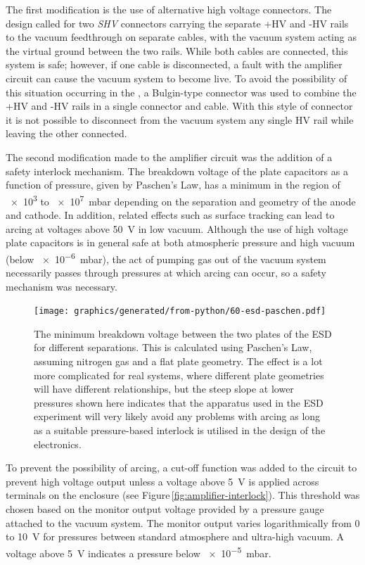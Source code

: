 The first modification is the use of alternative high voltage connectors. The \AEIPROTOTYPE{} design called for two \emph{SHV} connectors carrying the separate +\gls{HV} and -\gls{HV} rails to the vacuum feedthrough on separate cables, with the vacuum system acting as the virtual ground between the two rails. While both cables are connected, this system is safe; however, if one cable is disconnected, a fault with the amplifier circuit can cause the vacuum system to become live. To avoid the possibility of this situation occurring in the \SSM{}, a Bulgin-type connector was used to combine the +\gls{HV} and -\gls{HV} rails in a single connector and cable. With this style of connector it is not possible to disconnect from the vacuum system any single \gls{HV} rail while leaving the other connected.

The second modification made to the amplifier circuit was the addition of a safety interlock mechanism. The breakdown voltage of the plate capacitors as a function of pressure, given by Paschen's Law, has a minimum in the region of \SI{e3}{} to \SI{e7}{\milli\bar} depending on the separation and geometry of the anode and cathode. In addition, related effects such as surface tracking can lead to arcing at voltages above \SI{50}{\volt} in low vacuum. Although the use of high voltage plate capacitors is in general safe at both atmospheric pressure and high vacuum (below \SI{e-6}{\milli\bar}), the act of pumping gas out of the vacuum system necessarily passes through pressures at which arcing can occur, so a safety mechanism was necessary.

\begin{figure}
  \centering
  \texttt{[image: graphics/generated/from-python/60-esd-paschen.pdf]}
  \caption[Minimum breakdown voltage between the two plates of the electrostatic drive for different separations]{\label{fig:esd-paschen}The minimum breakdown voltage between the two plates of the \gls{ESD} for different separations. This is calculated using Paschen's Law, assuming nitrogen gas and a flat plate geometry. The effect is a lot more complicated for real systems, where different plate geometries will have different relationships, but the steep slope at lower pressures shown here indicates that the apparatus used in the \gls{ESD} experiment will very likely avoid any problems with arcing as long as a suitable pressure-based interlock is utilised in the design of the electronics.}
\end{figure}

To prevent the possibility of arcing, a cut-off function was added to the circuit to prevent high voltage output unless a voltage above \SI{5}{\volt} is applied across terminals on the enclosure (see Figure\,\ref{fig:amplifier-interlock}). This threshold was chosen based on the monitor output voltage provided by a pressure gauge attached to the vacuum system. The monitor output varies logarithmically from \SI{0}{} to \SI{10}{\volt} for pressures between standard atmosphere and ultra-high vacuum. A voltage above \SI{5}{\volt} indicates a pressure below \SI{e-5}{\milli\bar}.


